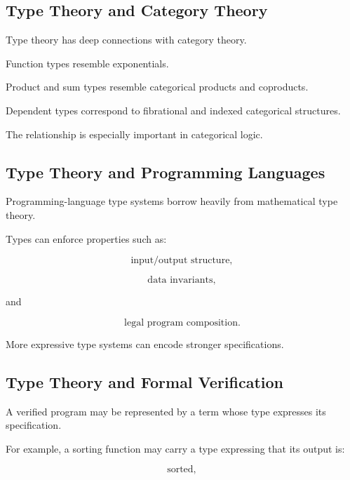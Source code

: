 \subsection{Type Theory and Category Theory}
\label{subsec:type-theory-category-theory}

Type theory has deep connections with category theory.

Function types resemble exponentials.

Product and sum types resemble categorical products and coproducts.

Dependent types correspond to fibrational and indexed categorical
structures.

The relationship is especially important in categorical logic.

\subsection{Type Theory and Programming Languages}
\label{subsec:type-theory-programming-languages}

Programming-language type systems borrow heavily from mathematical type
theory.

Types can enforce properties such as:

\[
\boxed{
\text{input/output structure},
}
\]

\[
\boxed{
\text{data invariants},
}
\]

and

\[
\boxed{
\text{legal program composition}.
}
\]

More expressive type systems can encode stronger specifications.

\subsection{Type Theory and Formal Verification}
\label{subsec:type-theory-formal-verification}

A verified program may be represented by a term whose type expresses its
specification.

For example, a sorting function may carry a type expressing that its output
is:

\[
\boxed{
\text{sorted},
}
\]

